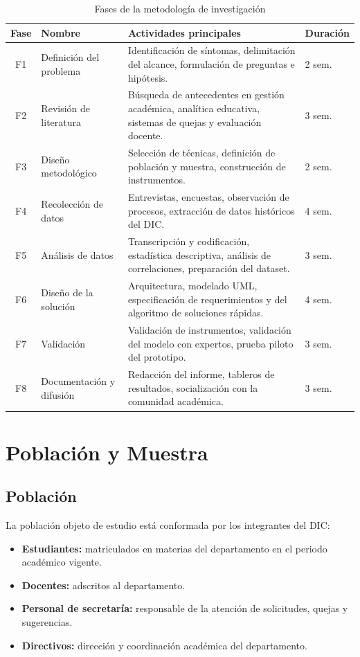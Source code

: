 \begin{table}[H]
\centering
\caption{Fases de la metodología de investigación}
\label{tab:fases}
\small
\begin{tabularx}{\textwidth}{@{}c l X l@{}}
\toprule
\rowcolor{azulClaro}
\textbf{Fase} & \textbf{Nombre} & \textbf{Actividades principales} & \textbf{Duración} \\
\midrule
F1 & Definición del problema &
    Identificación de síntomas, delimitación del alcance, formulación de preguntas
    e hipótesis. & 2 sem. \\
F2 & Revisión de literatura &
    Búsqueda de antecedentes en gestión académica, analítica educativa, sistemas
    de quejas y evaluación docente. & 3 sem. \\
F3 & Diseño metodológico &
    Selección de técnicas, definición de población y muestra, construcción de
    instrumentos. & 2 sem. \\
F4 & Recolección de datos &
    Entrevistas, encuestas, observación de procesos, extracción de datos
    históricos del \ac{DIC}. & 4 sem. \\
F5 & Análisis de datos &
    Transcripción y codificación, estadística descriptiva, análisis de
    correlaciones, preparación del dataset. & 3 sem. \\
F6 & Diseño de la solución &
    Arquitectura, modelado \ac{UML}, especificación de requerimientos y del
    algoritmo de soluciones rápidas. & 4 sem. \\
F7 & Validación &
    Validación de instrumentos, validación del modelo con expertos, prueba piloto
    del prototipo. & 3 sem. \\
F8 & Documentación y difusión &
    Redacción del informe, tableros de resultados, socialización con la comunidad
    académica. & 3 sem. \\
\bottomrule
\end{tabularx}
\end{table}

\section{Población y Muestra}

\subsection{Población}
La población objeto de estudio está conformada por los integrantes del \ac{DIC}:

\begin{itemize}[leftmargin=1.4cm, itemsep=3pt]
  \item \textbf{Estudiantes:} matriculados en materias del departamento en el
        periodo académico vigente.
  \item \textbf{Docentes:} adscritos al departamento.
  \item \textbf{Personal de secretaría:} responsable de la atención de
        solicitudes, quejas y sugerencias.
  \item \textbf{Directivos:} dirección y coordinación académica del departamento.
\end{itemize}

